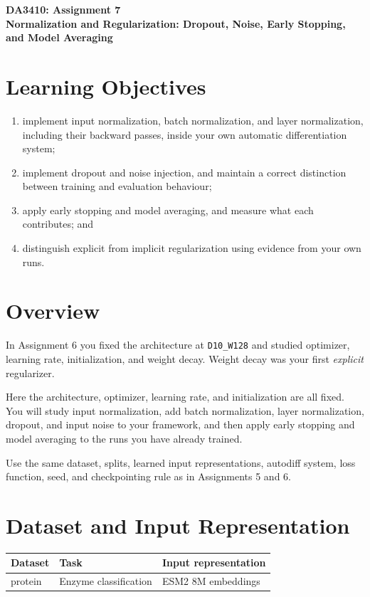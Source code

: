 \documentclass[11pt]{article}
\newcommand{\assignmentnumber}{7}
\begin{document}
\begin{center}
    {\Large \textbf{DA3410: Assignment \assignmentnumber}}\\[0.25em]
    {\large \textbf{Normalization and Regularization: Dropout, Noise, Early Stopping, and Model Averaging}}
\end{center}

\section{Learning Objectives}

\begin{enumerate}
    \item implement input normalization, batch normalization, and layer normalization, including their backward passes, inside your own automatic differentiation system;
    \item implement dropout and noise injection, and maintain a correct distinction between training and evaluation behaviour;
    \item apply early stopping and model averaging, and measure what each contributes; and
    \item distinguish explicit from implicit regularization using evidence from your own runs.
\end{enumerate}

\section{Overview}
In Assignment 6 you fixed the architecture at \texttt{D10\_W128} and studied optimizer, learning rate, initialization, and weight decay. Weight decay was your first \emph{explicit} regularizer.

Here the architecture, optimizer, learning rate, and initialization are all fixed. You will study input normalization, add batch normalization, layer normalization, dropout, and input noise to your framework, and then apply early stopping and model averaging to the runs you have already trained.

Use the same dataset, splits, learned input representations, autodiff system, loss function, seed, and checkpointing rule as in Assignments 5 and 6.

\section{Dataset and Input Representation}
\begin{center}
\begin{tabular}{lll}
\toprule
Dataset & Task & Input representation \\
\midrule
protein & Enzyme classification & ESM2 8M embeddings \\
\bottomrule
\end{tabular}
\end{center}
\end{document}
